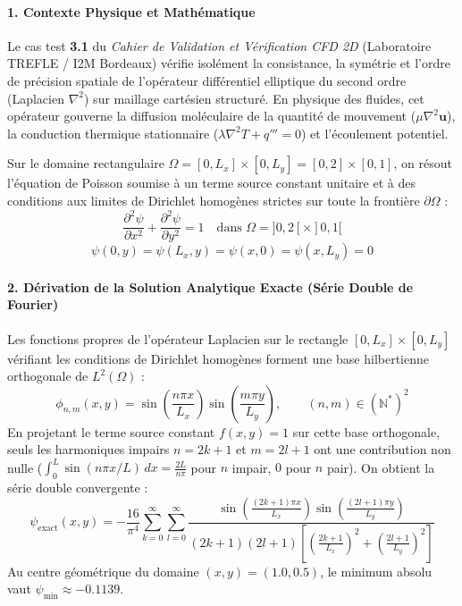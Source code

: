 \documentclass[
  10pt,
]{article}
\begin{document}
\paragraph{1. Contexte Physique et
Mathématique}\label{contexte-physique-et-mathuxe9matique}

Le cas test \textbf{3.1} du \emph{Cahier de Validation et Vérification
CFD 2D} (Laboratoire TREFLE / I2M Bordeaux) vérifie isolément la
consistance, la symétrie et l'ordre de précision spatiale de l'opérateur
différentiel elliptique du second ordre (Laplacien \(\nabla^2\)) sur
maillage cartésien structuré. En physique des fluides, cet opérateur
gouverne la diffusion moléculaire de la quantité de mouvement
(\(\mu \nabla^2 \mathbf{u}\)), la conduction thermique stationnaire
(\(\lambda \nabla^2 T + q''' = 0\)) et l'écoulement potentiel.

Sur le domaine rectangulaire
\(\Omega = [0, L_x] \times [0, L_y] = [0, 2] \times [0, 1]\), on résout
l'équation de Poisson soumise à un terme source constant unitaire et à
des conditions aux limites de Dirichlet homogènes strictes sur toute la
frontière \(\partial\Omega\) :
\[\frac{\partial^2 \psi}{\partial x^2} + \frac{\partial^2 \psi}{\partial y^2} = 1 \quad \text{dans } \Omega = ]0, 2[ \times ]0, 1[\]
\[\psi(0, y) = \psi(L_x, y) = \psi(x, 0) = \psi(x, L_y) = 0\]

\paragraph{2. Dérivation de la Solution Analytique Exacte (Série Double
de
Fourier)}\label{duxe9rivation-de-la-solution-analytique-exacte-suxe9rie-double-de-fourier}

Les fonctions propres de l'opérateur Laplacien sur le rectangle
\([0, L_x] \times [0, L_y]\) vérifiant les conditions de Dirichlet
homogènes forment une base hilbertienne orthogonale de \(L^2(\Omega)\) :
\[\phi_{n,m}(x, y) = \sin\left(\frac{n \pi x}{L_x}\right) \sin\left(\frac{m \pi y}{L_y}\right), \qquad (n, m) \in (\mathbb{N}^*)^2\]
En projetant le terme source constant \(f(x, y) = 1\) sur cette base
orthogonale, seuls les harmoniques impairs \(n = 2k+1\) et \(m = 2l+1\)
ont une contribution non nulle
(\(\int_0^L \sin(n\pi x/L)\,dx = \frac{2L}{n\pi}\) pour \(n\) impair,
\(0\) pour \(n\) pair). On obtient la série double convergente :
\[\psi_{\text{exact}}(x, y) = -\frac{16}{\pi^4} \sum_{k=0}^{\infty} \sum_{l=0}^{\infty} \frac{\sin\left(\frac{(2k+1)\pi x}{L_x}\right) \sin\left(\frac{(2l+1)\pi y}{L_y}\right)}{(2k+1)(2l+1) \left[ \left(\frac{2k+1}{L_x}\right)^2 + \left(\frac{2l+1}{L_y}\right)^2 \right]}\]
Au centre géométrique du domaine \((x, y) = (1.0, 0.5)\), le minimum
absolu vaut \(\psi_{\min} \approx -0.1139\).
\end{document}
